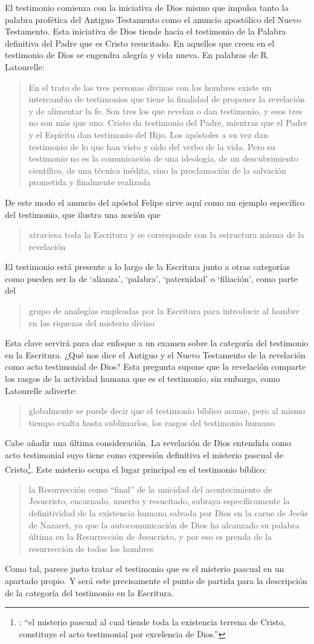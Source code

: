 El testimonio comienza con la iniciativa de Dios mismo que impulsa tanto la palabra profética del Antiguo Testamento como el anuncio apostólico del Nuevo Testamento. Esta iniciativa de Dios tiende hacia el testimonio de la Palabra definitiva del Padre que es Cristo resucitado. En aquellos que creen en el testimonio de Dios se engendra alegría y vida nueva. En palabras de R. Latourelle: \blockquote[{\cite[1530]{latourelle2000testimonio}}]{En el trato de las tres personas divinas con los hombres existe un intercambio de testimonios que tiene la finalidad de proponer la revelación y de alimentar la fe. Son tres los que revelan o dan testimonio, y esos tres no son más que uno. Cristo da testimonio del Padre, mientras que el Padre y el Espíritu dan testimonio del Hijo. Los apóstoles a su vez dan testimonio de lo que han visto y oído del verbo de la vida. Pero su testimonio no es la comunicación de una ideología, de un descubrimiento científico, de una técnica inédita, sino la proclamación de la salvación prometida y finalmente realizada}.

De este modo el anuncio del apóstol Felipe sirve aquí como un ejemplo específico del testimonio, que ilustra una noción que \blockquote[{\cite[109]{prades2015testimonio}}]{atraviesa toda la Escritura y se corresponde con la estructura misma de la revelación}. El testimonio está presente a lo largo de la Escritura junto a otras categorías como pueden ser la de `alianza', `palabra', `paternidad' o `filiación', como parte del \blockquote[{\cite[1523]{latourelle2000testimonio}}]{grupo de analogías empleadas por la Escritura para introducir al hombre en las riquezas del misterio divino}.

Esta clave servirá para dar enfoque a un examen sobre la categoría del testimonio en la Escritura. ¿Qué nos dice el Antiguo y el Nuevo Testamento de la revelación como acto testimonial de Dios? Esta pregunta supone que la revelación comparte los rasgos de la actividad humana que es el testimonio, sin embargo, como Latourelle adiverte: \blockquote[{\cite[1526]{latourelle2000testimonio}}]{globalmente se puede decir que el testimonio bíblico asume, pero al mismo tiempo exalta hasta sublimarlos, los rasgos del testimonio humano}.

Cabe añadir una última consideración. La revelación de Dios entendida como acto testimonial suyo tiene como expresión definitiva el misterio pascual de Cristo\footnote{\cite[128]{prades2015testimonio}: \enquote{el misterio pascual al cual tiende toda la existencia terrena de Cristo, constituye el acto testimonial por excelencia de Dios.}}. Este misterio ocupa el lugar principal en el testimonio bíblico: \blockquote[{\cite[404]{ninot2009tf}}]{la Resurrección como ``final'' de la unicidad del acontecimiento de Jesucristo, encarnado, muerto y resucitado, subraya específicamente la definitividad de la existencia humana salvada por Dios en la carne de Jesús de Nazaret, ya que la autocomunicación de Dios ha alcanzado su palabra última en la Resurrección de Jesucristo, y por eso es prenda de la resurrección de todos los hombres}. Como tal, parece justo tratar el testimonio que es el misterio pascual en un apartado propio. Y será este precisamente el punto de partida para la descripción de la categoría del testimonio en la Escritura.

